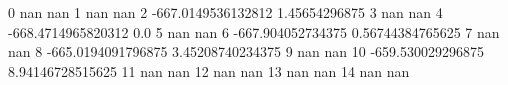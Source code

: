 0 nan nan
1 nan nan
2 -667.0149536132812 1.45654296875
3 nan nan
4 -668.4714965820312 0.0
5 nan nan
6 -667.904052734375 0.56744384765625
7 nan nan
8 -665.0194091796875 3.45208740234375
9 nan nan
10 -659.530029296875 8.94146728515625
11 nan nan
12 nan nan
13 nan nan
14 nan nan
